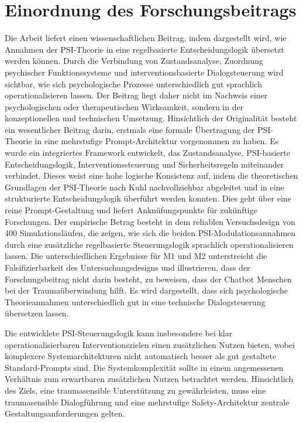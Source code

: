 \section{Einordnung des Forschungsbeitrags}
Die Arbeit liefert einen wissenschaftlichen Beitrag, indem dargestellt wird, wie Annahmen der PSI-Theorie in eine regelbasierte Entscheidungslogik übersetzt werden können. 
Durch die Verbindung von Zustandsanalyse, Zuordnung psychischer Funktionssysteme und interventionsbasierte Dialogsteuerung wird sichtbar, wie sich psychologische Prozesse unterschiedlich gut sprachlich operationalisieren lassen. Der Beitrag liegt daher nicht im Nachweis einer psychologischen oder therapeutischen Wirksamkeit, sondern in der konzeptionellen und technischen Umsetzung.
Hinsichtlich der Originalität besteht ein wesentlicher Beitrag darin, erstmals eine formale Übertragung der PSI-Theorie in eine mehrstufige Prompt-Architektur vorgenommen zu haben. 
Es wurde ein integriertes Framework entwickelt, das Zustandsanalyse, PSI-basierte Entscheidungslogik, Interventionssteuerung und Sicherheitsregeln miteinander verbindet. Dieses weist eine hohe logische Konsistenz auf, indem die theoretischen Grundlagen der PSI-Theorie nach Kuhl nachvollziehbar abgeleitet und in eine strukturierte Entscheidungslogik überführt werden konnten. Dies geht über eine reine Prompt-Gestaltung und liefert Anknüfungspunkte für zukünftige Forschungen.
Der empirische Betrag besteht in dem reliablen Versuchsdesign von 400 Simulationsläufen, die zeigen, wie sich die beiden PSI-Modulationsannahmen durch eine zusätzliche regelbasierte Steuerungslogik sprachlich operationalisieren lassen. Die unterschiedlichen Ergebnisse für M1 und M2 unterstreicht die Falsifizierbarkeit des Untersuchungsdesigns und illustrieren, dass der Forschungsbeitrag nicht darin besteht, zu beweisen, dass der Chatbot Menschen bei der Traumaüberwindung hilft. Es wird dargestellt, dass sich psychologische Theorieannahmen unterschiedlich gut in eine technische Dialogsteuerung übersetzen lassen.

Die entwicklete PSI-Steuerungslogik kann insbesondere bei klar operationalisierbaren Interventionszielen einen zusätzlichen Nutzen bieten, wobei komplexere Systemarchitekturen nicht automatisch besser als gut gestaltete Standard-Prompts sind.
Die Systemkomplexität sollte in einem angemessenen Verhältnis zum erwartbaren zusätzlichen Nutzen betrachtet werden. Hinsichtlich des Ziels, eine traumasensible Unterstützung zu gewährleisten, muss eine traumasensible Dialogführung und eine mehrstufige Safety-Architektur zentrale Gestaltungsanforderungen gelten.

